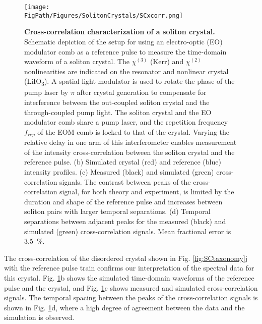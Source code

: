 \begin{figure}[htpb]
	\begin{center}
		\texttt{[image: \\FigPath/Figures/SolitonCrystals/SCxcorr.png]}
	\end{center}
	\caption[Cross-correlation characterization of a soliton crystal]{\textbf{Cross-correlation characterization of a soliton crystal.} Schematic depiction of the setup for using an electro-optic (EO) modulator comb as a reference pulse to measure the time-domain waveform of a soliton crystal. The $\chi^{(3)}$ (Kerr) and $\chi^{(2)}$ nonlinearities are indicated on the resonator and nonlinear crystal (LiIO\textsubscript{3}). A spatial light modulator is used to rotate the phase of the pump laser by $\pi$ after crystal generation to compensate for interference between the out-coupled soliton crystal and the through-coupled pump light. The soliton crystal and the EO modulator comb share a pump laser, and the repetition frequency $f_{rep}$ of the EOM comb is locked to that of the crystal. Varying the relative delay in one arm of this interferometer enables measurement of the intensity cross-correlation between the soliton crystal and the reference pulse. (b)  Simulated crystal (red) and reference (blue) intensity profiles. (c) Measured (black) and simulated (green) cross-correlation signals. The contrast between peaks of the cross-correlation signal, for both theory and experiment, is limited by the duration and shape of the reference pulse and increases between soliton pairs with larger temporal separations. (d) Temporal separations between adjacent peaks for the measured (black) and simulated (green) cross-correlation signals. Mean fractional error is 3.5~$\%$.}
	\label{fig:SCxcorr}
\end{figure} 

 
The cross-correlation of the disordered crystal shown in Fig. \ref{fig:SCtaxonomy}j with the reference pulse train confirms our interpretation of the spectral data for this crystal. Fig. \ref{fig:SCxcorr}b shows the simulated time-domain waveforms of the reference pulse and the crystal, and Fig. \ref{fig:SCxcorr}c shows measured and simulated cross-correlation signals. The temporal spacing between the peaks of the cross-correlation signals is shown in Fig. \ref{fig:SCxcorr}d, where a high degree of agreement between the data and the simulation is observed. 

